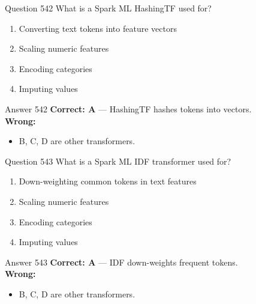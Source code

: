 \documentclass[aspectratio=169,11pt]{beamer}
\begin{document}
	\begin{frame}{Question 542}
		What is a Spark ML HashingTF used for?
		\begin{enumerate}[label=\Alph*.]
			\item Converting text tokens into feature vectors
			\item Scaling numeric features
			\item Encoding categories
			\item Imputing values
		\end{enumerate}
	\end{frame}
	\begin{frame}{Answer 542}
		\textbf{Correct: A} --- HashingTF hashes tokens into vectors.\\
		\vspace{0.5em}
		\textbf{Wrong:}
		\begin{itemize}
			\item B, C, D are other transformers.
		\end{itemize}
	\end{frame}
	
	\begin{frame}{Question 543}
		What is a Spark ML IDF transformer used for?
		\begin{enumerate}[label=\Alph*.]
			\item Down-weighting common tokens in text features
			\item Scaling numeric features
			\item Encoding categories
			\item Imputing values
		\end{enumerate}
	\end{frame}
	\begin{frame}{Answer 543}
		\textbf{Correct: A} --- IDF down-weights frequent tokens.\\
		\vspace{0.5em}
		\textbf{Wrong:}
		\begin{itemize}
			\item B, C, D are other transformers.
		\end{itemize}
	\end{frame}
	
\end{document}
